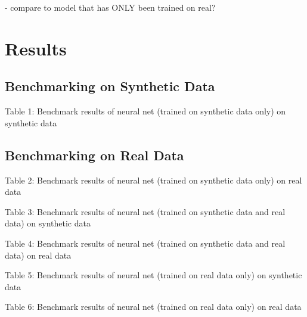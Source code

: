 \documentclass[11pt]{article}
\begin{document}
- compare to model that has ONLY been trained on real?

\section{Results}
\subsection{Benchmarking on Synthetic Data}

\begin{center}
	
\end{center}
Table 1: Benchmark results of neural net (trained on synthetic data only) on synthetic data


\subsection{Benchmarking on Real Data}

\begin{center}

\end{center}
Table 2: Benchmark results of neural net (trained on synthetic data only) on real data



\begin{center}

\end{center}
Table 3: Benchmark results of neural net (trained on synthetic data and real data) on synthetic data

\begin{center}

\end{center}
Table 4: Benchmark results of neural net (trained on synthetic data and real data) on real data

\begin{center}

\end{center}
Table 5: Benchmark results of neural net (trained on real data only) on synthetic data


\begin{center}

\end{center}
Table 6: Benchmark results of neural net (trained on real data only) on real data
\end{document}
